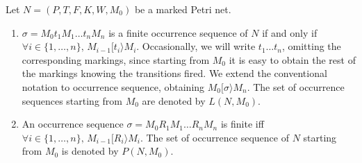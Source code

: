 \begin{definition} 
Let $N=(P,T,F,K,W,M_0)$ be a marked Petri net.
\begin{enumerate}
\item $\sigma = M_0 t_1 M_1 \ldots t_n M_n$ is a finite occurrence sequence of $N$
if and only if $\forall i \in \{1,\ldots,n\},\,M_{i-1} [ t_i \rangle M_i$.
Occasionally, we will write $t_1 \ldots t_n$, omitting the corresponding markings, since starting from
$M_0$ it is easy to obtain the rest of the markings knowing the transitions fired.
We extend the conventional notation to occurrence sequence, 
obtaining $M_0 [ \sigma \rangle M_n$.
The set of occurrence sequences starting from $M_0$ are denoted by $L(N,M_0)$.

\item An occurrence sequence $\sigma = M_0 R_1 M_1 \ldots R_n M_n$ is finite
iff $\forall i \in \{1,\ldots,n\},\,M_{i-1} [ R_i \rangle M_i$.
The set of occurrence sequence of $N$ starting from $M_0$ is denoted by $P(N,M_0)$.
\end{enumerate}
\end{definition}



%
%
%

